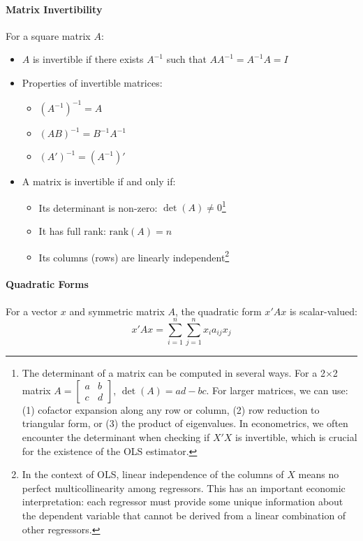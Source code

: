 \paragraph{Matrix Invertibility}
For a square matrix \(A\):
\begin{itemize}
    \item \(A\) is invertible if there exists \(A^{-1}\) such that \(AA^{-1} = A^{-1}A = I\)
    \item Properties of invertible matrices:
        \begin{itemize}
            \item \((A^{-1})^{-1} = A\)
            \item \((AB)^{-1} = B^{-1}A^{-1}\)
            \item \((A')^{-1} = (A^{-1})'\)
        \end{itemize}
    \item A matrix is invertible if and only if:
        \begin{itemize}
            \item Its determinant is non-zero: \(\det(A) \neq 0\)\footnote{The determinant of a matrix can be computed in several ways. For a 2×2 matrix \(A = \begin{bmatrix} a & b \\ c & d \end{bmatrix}\), \(\det(A) = ad - bc\). For larger matrices, we can use: (1) cofactor expansion along any row or column, (2) row reduction to triangular form, or (3) the product of eigenvalues. In econometrics, we often encounter the determinant when checking if \(X'X\) is invertible, which is crucial for the existence of the OLS estimator.}
            \item It has full rank: \(\text{rank}(A) = n\)
            \item Its columns (rows) are linearly independent\footnote{In the context of OLS, linear independence of the columns of \(X\) means no perfect multicollinearity among regressors. This has an important economic interpretation: each regressor must provide some unique information about the dependent variable that cannot be derived from a linear combination of other regressors.}
        \end{itemize}
\end{itemize}

\paragraph{Quadratic Forms}
For a vector \(x\) and symmetric matrix \(A\), the quadratic form \(x'Ax\) is scalar-valued:
\[ x'Ax = \sum_{i=1}^n \sum_{j=1}^n x_i a_{ij} x_j \]

